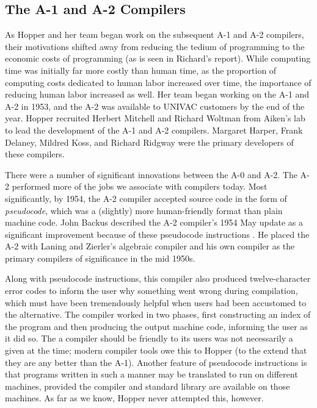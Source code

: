 \subsection{The A-1 and A-2 Compilers}
\label{sec:a1-a2-compilers}

As Hopper and her team began work on the subsequent A-1 and A-2 compilers,
their motivations shifted away from reducing the tedium of programming to the
economic costs of programming (as is seen in Richard's report).
While computing time was initially far more
costly than human time, as the proportion of computing costs dedicated to human
labor increased over time, the importance of reducing human labor increased as
well.
Her team began working on the A-1 and A-2 in 1953, and the A-2 was
available to UNIVAC customers by the end of the year.
Hopper recruited Herbert Mitchell and Richard Woltman from Aiken's
lab to lead the development of the A-1 and A-2 compilers.
Margaret Harper, Frank Delaney, Mildred Koss, and Richard Ridgway were
the primary developers of these compilers.

There were a number of significant innovations between the A-0 and A-2.
The A-2 performed more of the jobs we associate with compilers today.
Most significantly, by 1954, the A-2 compiler accepted source code
in the form of \textit{pseudocode}, which was a (slightly) more human-friendly
format than plain machine code.
John Backus described the A-2 compiler's 1954 May update as a significant
improvement because of these pseudocode instructions
\cite{hopl_backus_history_of_fortran}.
He placed the A-2 with Laning and Zierler's algebraic compiler and
his own \FTNI{} compiler as the primary compilers of significance in the
mid 1950s.

Along with pseudocode instructions, this compiler also produced
twelve-character error codes to inform the user why something went wrong
during compilation, which must have been tremendously helpful when users
had been accustomed to the alternative.
The compiler worked in two phases, first constructing an index of the
program and then producing the output machine code, informing the user as
it did so.
The a compiler should be friendly to its users was not necessarily a given at
the time; modern compiler tools owe this to Hopper (to the extend that they
are any better than the A-1).
Another feature of pseudocode instructions is that programs written
in such a manner may be translated to run on different machines, provided
the compiler and standard library are available on those machines.
As far as we know, Hopper never attempted this, however.

